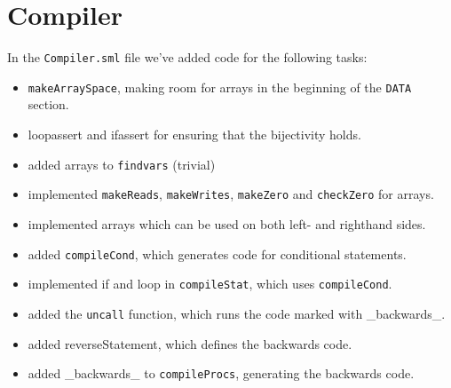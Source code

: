 \section{Compiler}

In the {\tt Compiler.sml} file we've added code for the following tasks:

\begin{itemize}
\item {\tt makeArraySpace}, making room for arrays in the beginning of the {\tt DATA} section.
\item loopassert and ifassert for ensuring that the bijectivity holds.
\item added arrays to {\tt findvars} (trivial)
\item implemented {\tt makeReads}, {\tt makeWrites}, {\tt makeZero} and {\tt checkZero} for arrays. 
\item implemented arrays which can be used on both left- and righthand sides.
\item added {\tt compileCond}, which generates code for conditional statements.
\item implemented if and loop in {\tt compileStat}, which uses {\tt compileCond}.
\item added the {\tt uncall} function, which runs the code marked with \_backwards\_.
\item added reverseStatement, which defines the backwards code.
\item added \_backwards\_ to {\tt compileProcs}, generating the backwards code.
\end{itemize}

